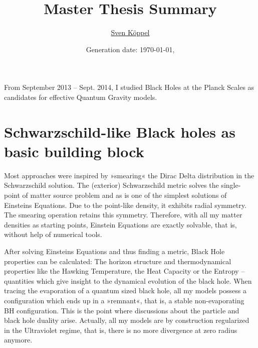 \documentclass[10pt,a4paper, fleqn]{article}
\title{\vspace*{-9ex} Master Thesis Summary \vspace{-1ex}} %
\author{\small %
\href{https://fias.uni-frankfurt.de/~koeppel}{Sven Köppel}\vspace{-1ex}}
\date{\small Generation date: \today, \currenttime}
\begin{document}
\maketitle

\renewcommand{\d}{\mathrm{d}}
\newcommand{\dd}[2]{\frac{\mathrm{d} #1}{\mathrm{d} #2}}
\newcommand{\pp}[2]{\frac{\partial #1}{\partial #2}}
\renewcommand{\L}{L_P}
\newcommand{\pr}{p_r}
\newcommand{\psenk}{p_\perp}
\newcommand{\ebenso}{\biggl( ~ \therefore ~ \biggr) }
\newcommand{\metrik}[1]{\d s^2 = \left( #1 \right) \d t^2 \left( #1 \right)^{-1} \d r^2 + r^2 \d \Omega_{D-2}^2 }
\newcommand{\winkel}{r^2 \d \Omega^2}
\newcommand{\dann}{$\rightarrow~$}
\newcommand{\CA}{ {\cal A}}
\newcommand{\C}[1]{ {\cal #1}}
\newcommand{\mn}{_{\mu\nu}}

\newcommand*{\mathcolor}{}
\def\mathcolor#1#{\mathcoloraux{#1}}
\newcommand*{\mathcoloraux}[3]{%
  \protect\leavevmode
  \begingroup
    \color#1{#2}#3%
  \endgroup
}
\newcommand{\redmin}{\mathcolor{red}{-}}
\newcommand{\redplus}{\mathcolor{red}{+}}
\newcommand{\pn}{\mathcolor{OliveGreen}{+ n}}
\newcommand{\n}{ {\mathcolor{OliveGreen}{n}} }



From September 2013 -- Sept. 2014, I studied Black Holes at the Planck Scales as candidates for effective Quantum Gravity models.

\section*{Schwarzschild-like Black holes as basic building block}
Most approaches were inspired by »smearing« the Dirac Delta distribution in the Schwarzschild solution. The (exterior) Schwarzschild metric solves the single-point of matter source problem and as is one of the simplest solutions of Einsteins Equations. Due to the point-like density, it exhibits radial symmetry. The smearing operation retains this symmetry. Therefore, with all my matter densities as starting points, Einstein Equations are exactly solvable, that is, without help of numerical tools.

After solving Einsteins Equations and thus finding a metric, Black Hole properties can be calculated: The horizon structure and thermodynamical properties like the Hawking Temperature, the Heat Capacity or the Entropy -- quantities which give insight to the dynamical evolution of the black hole. When tracing the evaporation of a quantum sized black hole, all my models possess a configuration which ends up in a »remnant«, that is, a stable non-evaporating BH configuration. This is the point where discussions about the particle and black hole duality arise. Actually, all my models are by construction regularized in the Ultraviolet regime, that is, there is no more divergence at zero radius anymore.
\end{document}
